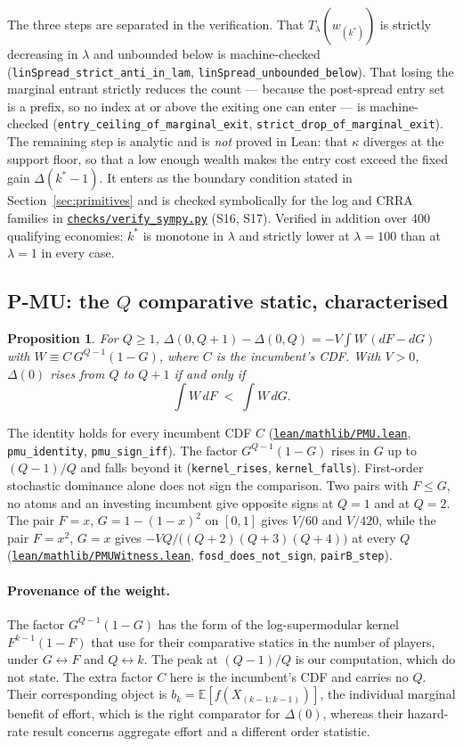 \documentclass[11pt]{article}
\newtheorem{proposition}{Proposition}
\newcommand{\file}[1]{\href{run:#1}{\texttt{#1}}}
\begin{document}
The three steps are separated in the verification. That
$T_\lambda(w_{(k^*)})$ is strictly decreasing in $\lambda$ and unbounded
below is machine-checked (\texttt{linSpread\_strict\_anti\_in\_lam},
\texttt{linSpread\_unbounded\_below}). That losing the marginal entrant
strictly reduces the count --- because the post-spread entry set is a prefix,
so no index at or above the exiting one can enter --- is machine-checked
(\texttt{entry\_ceiling\_of\_marginal\_exit},
\texttt{strict\_drop\_of\_marginal\_exit}). The remaining step is analytic and
is \emph{not} proved in Lean: that $\kappa$ diverges at the support floor, so
that a low enough wealth makes the entry cost exceed the fixed gain
$\Delta(k^*-1)$. It enters as the boundary condition stated in
Section~\ref{sec:primitives} and is checked symbolically for the log and
CRRA families in \file{checks/verify\_sympy.py} (S16, S17). Verified in
addition over 400 qualifying economies: $k^*$ is monotone in $\lambda$ and
strictly lower at $\lambda=100$ than at $\lambda=1$ in every case.

\subsection{P-MU: the \texorpdfstring{$Q$}{Q} comparative static, characterised}
\label{prop:PMU}

\begin{proposition}
For $Q\ge1$, $\Delta(0,Q{+}1)-\Delta(0,Q) = -V\int W\,(dF-dG)$ with
$W \equiv C\,G^{Q-1}(1-G)$, where $C$ is the incumbent's CDF. With $V>0$,
$\Delta(0)$ rises from $Q$ to $Q+1$ if and only if
\[
  \int W\,dF \;<\; \int W\,dG .
\]
\end{proposition}
The identity holds for every incumbent CDF $C$
(\file{lean/mathlib/PMU.lean}, \texttt{pmu\_identity}, \texttt{pmu\_sign\_iff}).
The factor $G^{Q-1}(1-G)$ rises in $G$ up to $(Q-1)/Q$ and falls beyond it
(\texttt{kernel\_rises}, \texttt{kernel\_falls}). First-order stochastic
dominance alone does not sign the comparison. Two pairs with $F\le G$, no atoms
and an investing incumbent give opposite signs at $Q=1$ and at $Q=2$. The pair
$F=x$, $G=1-(1-x)^2$ on $[0,1]$ gives $V/60$ and $V/420$, while the pair
$F=x^2$, $G=x$ gives $-VQ/\big((Q+2)(Q+3)(Q+4)\big)$ at every $Q$
(\file{lean/mathlib/PMUWitness.lean}, \texttt{fosd\_does\_not\_sign},
\texttt{pairB\_step}).

\paragraph{Provenance of the weight.} The factor $G^{Q-1}(1-G)$ has the form of
the log-supermodular kernel $F^{k-1}(1-F)$ that \citet{RyvkinDrugov2020} use for
their comparative statics in the number of players, under $G \leftrightarrow F$
and $Q \leftrightarrow k$. The peak at $(Q-1)/Q$ is our computation, which
\citet{RyvkinDrugov2020} do not state. The extra factor $C$ here is the
incumbent's CDF and carries no $Q$. Their corresponding object is
$b_k = \mathbb{E}[f(X_{(k-1:k-1)})]$, the individual marginal benefit of effort,
which is the right comparator for $\Delta(0)$, whereas their hazard-rate result
concerns aggregate effort and a different order statistic.
\end{document}
